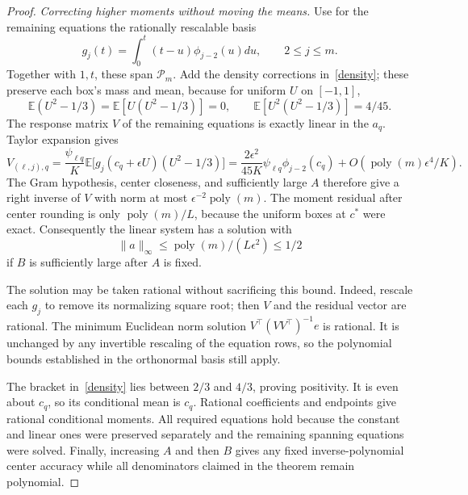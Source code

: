 \documentclass[11pt]{article}
\newcommand{\PP}{\mathcal P}
\begin{document}
\begin{proof}
\medskip\noindent\emph{Correcting higher moments without moving the means.}
Use for the remaining equations the rationally rescalable basis
\[
 g_j(t)=\int_0^t(t-u)\phi_{j-2}(u)du,
       \qquad 2\le j\le m.
\]
Together with $1,t$, these span $\PP_m$. Add the density corrections
in~\eqref{density}; these preserve each box's mass and mean, because
for uniform $U$ on $[-1,1]$,
\[
 \mathbb E(U^2-1/3)=\mathbb E[U(U^2-1/3)]=0,
 \qquad \mathbb E[U^2(U^2-1/3)]=4/45.
\]
The response matrix $V$ of the remaining equations is exactly linear
in the $a_q$. Taylor expansion gives
\[
 V_{(\ell,j),q}
 =\frac{\psi_{\ell q}}K\mathbb E\bigl[
      g_j(c_q+\epsilon U)(U^2-1/3)\bigr]
 =\frac{2\epsilon^2}{45K}\psi_{\ell q}\phi_{j-2}(c_q)
       +O(\operatorname{poly}(m)\epsilon^4/K).
\]
The Gram hypothesis, center closeness, and sufficiently large $A$
therefore give a right inverse of $V$ with norm at most
$\epsilon^{-2}\operatorname{poly}(m)$. The moment residual after
center rounding is only $\operatorname{poly}(m)/L$, because the
uniform boxes at $c^*$ were exact. Consequently the linear system
has a solution with
\[
 \|a\|_\infty\le\operatorname{poly}(m)/(L\epsilon^2)\le1/2
\]
if $B$ is sufficiently large after $A$ is fixed.

The solution may be taken rational without sacrificing this bound.
Indeed, rescale each $g_j$ to remove its normalizing square root;
then $V$ and the residual vector are rational. The minimum Euclidean
norm solution $V^\top(VV^\top)^{-1}e$ is rational. It is unchanged
by any invertible rescaling of the equation rows, so the polynomial
bounds established in the orthonormal basis still apply.

The bracket in~\eqref{density} lies between $2/3$ and $4/3$, proving
positivity. It is even about $c_q$, so its conditional mean is $c_q$.
Rational coefficients and endpoints give rational conditional moments.
All required equations hold because the constant and linear ones were
preserved separately and the remaining spanning equations were solved.
Finally, increasing $A$ and then $B$ gives any fixed inverse-polynomial
center accuracy while all denominators claimed in the theorem remain
polynomial.
\end{proof}
\end{document}

